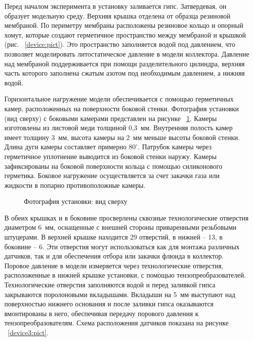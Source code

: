 Перед началом эксперимента в установку заливается гипс. Затвердевая, он образует модельную среду. Верхняя крышка отделена от образца резиновой мембраной. По периметру мембраны расположены резиновое кольцо и опорный хомут, которые создают герметичное пространство между мембраной и крышкой (рис. ~\ref{device:pict}). Это пространство заполняется водой под давлением, что позволяет моделировать литостатическое давление в модели коллектора. Давление над мембраной поддерживается при помощи разделительного цилиндра, верхняя часть которого заполнена сжатым азотом под необходимым давлением, а нижняя водой. 

Горизонтальное нагружение модели обеспечивается с помощью герметичных камер, расположенных на поверхности боковой стенки. Фотография установки (вид сверху) с боковыми камерами представлен на рисунке ~\ref{device2:pict}. Камеры изготовлены из листовой меди толщиной 0,3~мм. Внутренняя полость камер имеет толщину 3~мм, высота камеры на 2~мм меньше высоты боковой стенки. Длина дуги камеры составляет примерно $80^\circ$. Патрубок камеры через герметичное уплотнение выводится из боковой стенки наружу. Камеры зафиксированы на боковой поверхности кольца с помощью силиконового герметика. Боковое нагружение осуществляется за счет закачки газа или жидкости в попарно противоположные камеры.

\begin{figure}[hb]
\begin{center}
\end{center}
\caption{Фотография установки: вид сверху}\label{device2:pict}
\end{figure}

В обеих крышках и в боковине просверлены сквозные технологические отверстия диаметром 6~мм, оснащенные с внешней стороны приваренными резьбовыми штуцерами. В верхней крышке находится 29 отверстий, в нижней – 13, в боковине – 6. Эти отверстия могут использоваться как для монтажа различных датчиков, так и для обеспечения отбора или закачки флюида в коллектор. Поровое давление в модели измеряется через технологические отверстия, расположенные в нижней крышке установки, с помощью тензопреобразователей. Технологические отверстия заполняются водой и перед заливкой гипса закрываются поролоновыми вкладышами. Вкладыши на 5~мм выступают над поверхностью нижнего основания и после заливки гипса оказываются вмонтированы в него, обеспечивая передачу порового давления к тензопреобразователям. Схема расположения датчиков показана на рисунке ~\ref{device3:pict}.

